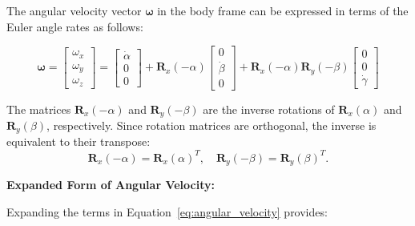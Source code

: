 \documentclass[12pt]{article}
\begin{document}
The angular velocity vector $\boldsymbol{\omega}$ in the body frame can be expressed in terms of the Euler angle rates as follows:

\begin{equation}
    \label{eq:angular_velocity}
    \boldsymbol{\omega}=
    \begin{bmatrix}
        \omega_x \\
        \omega_y \\
        \omega_z
    \end{bmatrix}
    =
    \begin{bmatrix}
        \dot{\alpha} \\
        0 \\
        0
    \end{bmatrix}
    +
    \mathbf{R}_x(-\alpha)
    \begin{bmatrix}
        0 \\
        \dot{\beta} \\
        0
    \end{bmatrix}
    +
    \mathbf{R}_x(-\alpha) \mathbf{R}_y(-\beta)
    \begin{bmatrix}
        0 \\
        0 \\
        \dot{\gamma}
    \end{bmatrix}
\end{equation}

The matrices $\mathbf{R}_x(-\alpha)$ and $\mathbf{R}_y(-\beta)$ are the inverse rotations of $\mathbf{R}_x(\alpha)$ and $\mathbf{R}_y(\beta)$, respectively. Since rotation matrices are orthogonal, the inverse is equivalent to their transpose:
\[
\mathbf{R}_x(-\alpha) = \mathbf{R}_x(\alpha)^T, \quad \mathbf{R}_y(-\beta) = \mathbf{R}_y(\beta)^T.
\]

\textbf{Expanded Form of Angular Velocity:}

Expanding the terms in Equation~\ref{eq:angular_velocity} provides:
\end{document}
